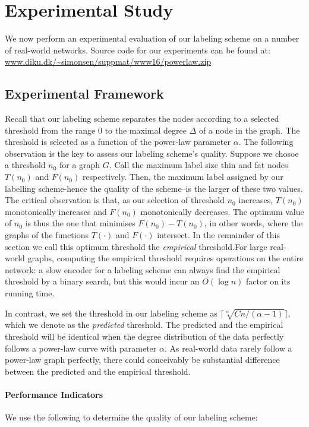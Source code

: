 \section{Experimental Study}

We now  perform an experimental evaluation of our labeling scheme on a number of real-world networks.
Source code for our experiments can be found at:\\ \url{www.diku.dk/~simonsen/suppmat/www16/powerlaw.zip}

\subsection{Experimental Framework}\label{Sec:Experimental}
Recall that our labeling scheme separates  the nodes according to a selected threshold from the range $0$ to the maximal degree $\Delta$ of a node in the graph. The threshold is selected as a function of  the power-law parameter $\alpha$.
The following observation is the key to assess our labeling scheme's quality.
Suppose we chosoe a threshold  $n_0$ for a graph $G$. Call  the maximum label size thin and fat nodes $T(n_0)$ and $F(n_0)$ respectively. Then, the maximum label assigned by our labelling scheme-hence the quality of the scheme--is the larger of these two values.
The critical observation is that, as our selection of threshold $n_0$ increases, $T(n_0)$ monotonically increases and  $F(n_0)$ monotonically decreases.
The optimum value of $n_0$ is thus the one that minimises  $F(n_0)-T(n_0)$, in other words, where the graphs of
the functions $T(\cdot)$ and $F(\cdot)$ intersect.
In the remainder of this section we call this optimum threshold the \emph{empirical} threshold.For large real-world graphs, computing the empirical threshold requires operations on the entire network: a slow encoder for a labeling scheme can always find the empirical threshold by a binary search, but this would incur an $O(\log n)$ factor on its running time. 

In contrast, we set the threshold in our labeling scheme as $\lceil \sqrt[\alpha]{C n/(\alpha-1)} \rceil$, which we denote as the \emph{predicted} threshold. The predicted and the empirical threshold will be identical when the degree distribution of the data perfectly follows a power-law curve with parameter $\alpha$. As real-world data rarely follow a power-law
graph perfectly, there could conceivably be substantial difference between the predicted and the empirical threshold.


\paragraph{Performance Indicators}
We use the following to determine the quality of our labeling scheme:

